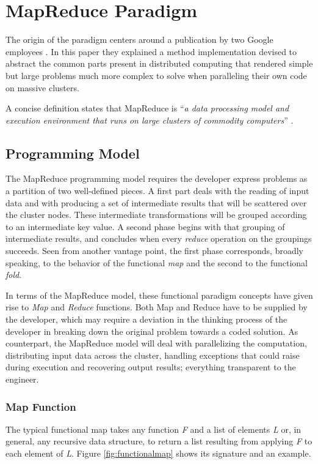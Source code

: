\section{MapReduce Paradigm}\label{sec:mapred}
\noindent The origin of the paradigm centers around a publication by two Google employees \cite{googlemapreduce}. In this paper they explained a method implementation devised to abstract the common parts present in distributed computing that rendered simple but large problems much more complex to solve when paralleling their own code on massive clusters.

A concise definition states that MapReduce is ``\textit{a data processing model and execution environment that runs on large clusters of commodity computers}'' \cite{hadoopdefguide}.

\subsection{Programming Model}\label{subsec:programacionmapred}
\noindent The MapReduce programming model requires the developer express problems as a partition of two well-defined pieces. A first part deals with the reading of input data and with producing a set of intermediate results that will be scattered over the cluster nodes. These intermediate transformations will be grouped according to an intermediate key value. A second phase begins with that grouping of intermediate results, and concludes when every \emph{reduce} operation on the groupings succeeds. Seen from another vantage point, the first phase corresponds, broadly speaking, to the behavior of the functional \emph{map} and the second to the functional \emph{fold}.

In terms of the MapReduce model, these functional paradigm concepts have given rise to \emph{Map} and \emph{Reduce} functions. Both Map and Reduce have to be supplied by the developer, which may require a deviation in the thinking process of the developer in breaking down the original problem towards a coded solution. As counterpart, the MapReduce model will deal with parallelizing the computation, distributing input data across the cluster, handling exceptions that could raise during execution and recovering output results; everything transparent to the engineer.

\subsubsection{Map Function}\label{map}
\noindent The typical functional map takes any function \emph{F} and a list of elements \emph{L} or, in general, any recursive data structure, to return a list resulting from applying \emph{F} to each element of \emph{L}. Figure \ref{fig:functionalmap} shows its signature and an example.

